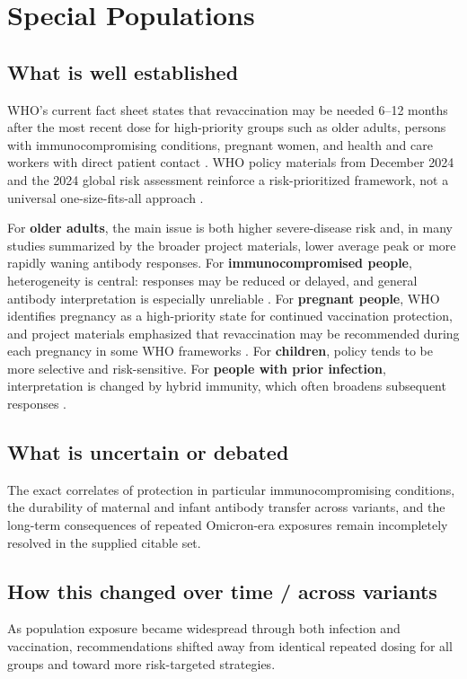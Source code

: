 \documentclass[12pt]{article}
\begin{document}
\section{Special Populations}
\subsection*{What is well established}
WHO's current fact sheet states that revaccination may be needed 6--12 months after the most recent dose for high-priority groups such as older adults, persons with immunocompromising conditions, pregnant women, and health and care workers with direct patient contact \cite{ref12}. WHO policy materials from December 2024 and the 2024 global risk assessment reinforce a risk-prioritized framework, not a universal one-size-fits-all approach \cite{ref9,ref10,ref11}.

For \textbf{older adults}, the main issue is both higher severe-disease risk and, in many studies summarized by the broader project materials, lower average peak or more rapidly waning antibody responses.  
For \textbf{immunocompromised people}, heterogeneity is central: responses may be reduced or delayed, and general antibody interpretation is especially unreliable \cite{ref8,ref12}.  
For \textbf{pregnant people}, WHO identifies pregnancy as a high-priority state for continued vaccination protection, and project materials emphasized that revaccination may be recommended during each pregnancy in some WHO frameworks \cite{ref11,ref12}.  
For \textbf{children}, policy tends to be more selective and risk-sensitive.  
For \textbf{people with prior infection}, interpretation is changed by hybrid immunity, which often broadens subsequent responses \cite{ref5}.

\subsection*{What is uncertain or debated}
The exact correlates of protection in particular immunocompromising conditions, the durability of maternal and infant antibody transfer across variants, and the long-term consequences of repeated Omicron-era exposures remain incompletely resolved in the supplied citable set.

\subsection*{How this changed over time / across variants}
As population exposure became widespread through both infection and vaccination, recommendations shifted away from identical repeated dosing for all groups and toward more risk-targeted strategies.
\end{document}
